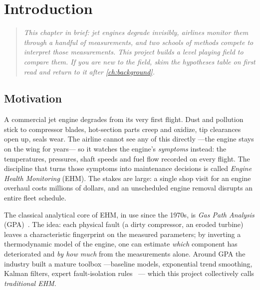 \chapter{Introduction}
\label{ch:introduction}

\begin{quote}\itshape
This chapter in brief: jet engines degrade invisibly, airlines monitor them through a handful
of measurements, and two schools of methods compete to interpret those measurements. This
project builds a level playing field to compare them. If you are new to the field, skim the
hypotheses table on first read and return to it after \cref{ch:background}.
\end{quote}



\section{Motivation}

A commercial jet engine degrades from its very first flight. Dust and pollution stick to
compressor blades, hot-section parts creep and oxidize, tip clearances open up, seals wear.
The airline cannot see any of this directly ---the engine stays on the wing for years--- so it
watches the engine's \emph{symptoms} instead: the temperatures, pressures, shaft speeds and fuel
flow recorded on every flight. The discipline that turns those symptoms into maintenance
decisions is called \emph{Engine Health Monitoring} (EHM). The stakes are large: a single shop
visit for an engine overhaul costs millions of dollars, and an unscheduled engine removal
disrupts an entire fleet schedule.

The classical analytical core of EHM, in use since the 1970s, is \emph{Gas Path Analysis}
(GPA)~\cite{Urban1975}. The idea: each physical fault (a dirty compressor, an eroded turbine)
leaves a characteristic fingerprint on the measured parameters; by inverting a thermodynamic
model of the engine, one can estimate \emph{which} component has deteriorated and \emph{by how
much} from the measurements alone. Around GPA the industry built a mature toolbox ---baseline
models, exponential trend smoothing, Kalman filters, expert fault-isolation rules%
~\cite{Volponi2014}--- which this project collectively calls \emph{traditional EHM}.

